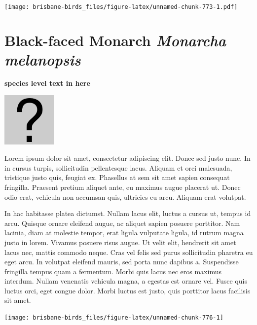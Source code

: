 \documentclass[]{book}
\let\origfigure\figure
\let\endorigfigure\endfigure
\renewenvironment{figure}[1][2] {
  \expandafter\origfigure\expandafter[H]
} {
  \endorigfigure
}
\begin{document}
\begin{figure}
\centering
\texttt{[image: brisbane-birds\_files/figure-latex/unnamed-chunk-773-1.pdf]}
\caption{\label{fig:unnamed-chunk-773}insert figure caption}
\end{figure}

\section{\texorpdfstring{Black-faced Monarch \emph{Monarcha
melanopsis}}{Black-faced Monarch Monarcha melanopsis}}\label{black-faced-monarch-monarcha-melanopsis}

\textbf{species level text in here}

\begin{figure}
\centering
\includegraphics{assets/missing.png}
\caption{No image for species}
\end{figure}

Lorem ipsum dolor sit amet, consectetur adipiscing elit. Donec sed justo
nunc. In in cursus turpis, sollicitudin pellentesque lacus. Aliquam et
orci malesuada, tristique justo quis, feugiat ex. Phasellus at sem sit
amet sapien consequat fringilla. Praesent pretium aliquet ante, eu
maximus augue placerat ut. Donec odio erat, vehicula non accumsan quis,
ultricies eu arcu. Aliquam erat volutpat.

In hac habitasse platea dictumst. Nullam lacus elit, luctus a cursus ut,
tempus id arcu. Quisque ornare eleifend augue, ac aliquet sapien posuere
porttitor. Nam lacinia, diam at molestie tempor, erat ligula vulputate
ligula, id rutrum magna justo in lorem. Vivamus posuere risus augue. Ut
velit elit, hendrerit sit amet lacus nec, mattis commodo neque. Cras vel
felis sed purus sollicitudin pharetra eu eget arcu. In volutpat eleifend
mauris, sed porta nunc dapibus a. Suspendisse fringilla tempus quam a
fermentum. Morbi quis lacus nec eros maximus interdum. Nullam venenatis
vehicula magna, a egestas est ornare vel. Fusce quis luctus orci, eget
congue dolor. Morbi luctus est justo, quis porttitor lacus facilisis sit
amet.

\begin{figure}
\texttt{[image: brisbane-birds\_files/figure-latex/unnamed-chunk-776-1]} \caption{insert figure caption}\label{fig:unnamed-chunk-776}
\end{figure}
\end{document}
